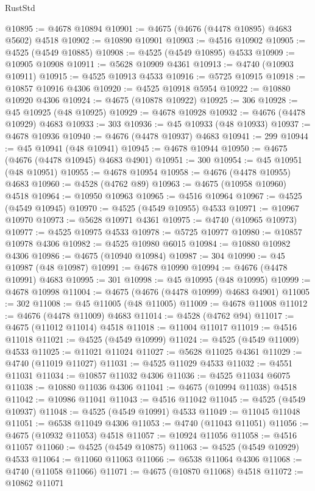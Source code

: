 \begin{lexlean}{RustStd}
\begin{coremodule}
{\begin{coremodule}
{{{{{{{{{{{{{{{{{{{{{{{{{{{{{{{{{{{{{{{{{{{{{{{{{{{{{{{{{{{{@10895 := @4678 @10894
@10901 := @4675 (@4676 (@4478 @10895) @4683 @5602) @4518
@10902 := @10890 @10901
@10903 := @4516 @10902
@10905 := @4525 (@4549 @10885)
@10908 := @4525 (@4549 @10895) @4533
@10909 := @10905 @10908
@10911 := @5628 @10909 @4361
@10913 := @4740 (@10903 @10911)
@10915 := @4525 @10913 @4533
@10916 := @5725 @10915
@10918 := @10857 @10916 @4306
@10920 := @4525 @10918 @5954
@10922 := @10880 @10920 @4306
@10924 := @4675 (@10878 @10922)
@10925 := 306
@10928 := @45 @10925 (@48 @10925)
@10929 := @4678 @10928
@10932 := @4676 (@4478 @10929) @4683
@10933 := 303
@10936 := @45 @10933 (@48 @10933)
@10937 := @4678 @10936
@10940 := @4676 (@4478 @10937) @4683
@10941 := 299
@10944 := @45 @10941 (@48 @10941)
@10945 := @4678 @10944
@10950 := @4675 (@4676 (@4478 @10945) @4683 @4901)
@10951 := 300
@10954 := @45 @10951 (@48 @10951)
@10955 := @4678 @10954
@10958 := @4676 (@4478 @10955) @4683
@10960 := @4528 (@4762 @89)
@10963 := @4675 (@10958 @10960) @4518
@10964 := @10950 @10963
@10965 := @4516 @10964
@10967 := @4525 (@4549 @10945)
@10970 := @4525 (@4549 @10955) @4533
@10971 := @10967 @10970
@10973 := @5628 @10971 @4361
@10975 := @4740 (@10965 @10973)
@10977 := @4525 @10975 @4533
@10978 := @5725 @10977
@10980 := @10857 @10978 @4306
@10982 := @4525 @10980 @6015
@10984 := @10880 @10982 @4306
@10986 := @4675 (@10940 @10984)
@10987 := 304
@10990 := @45 @10987 (@48 @10987)
@10991 := @4678 @10990
@10994 := @4676 (@4478 @10991) @4683
@10995 := 301
@10998 := @45 @10995 (@48 @10995)
@10999 := @4678 @10998
@11004 := @4675 (@4676 (@4478 @10999) @4683 @4901)
@11005 := 302
@11008 := @45 @11005 (@48 @11005)
@11009 := @4678 @11008
@11012 := @4676 (@4478 @11009) @4683
@11014 := @4528 (@4762 @94)
@11017 := @4675 (@11012 @11014) @4518
@11018 := @11004 @11017
@11019 := @4516 @11018
@11021 := @4525 (@4549 @10999)
@11024 := @4525 (@4549 @11009) @4533
@11025 := @11021 @11024
@11027 := @5628 @11025 @4361
@11029 := @4740 (@11019 @11027)
@11031 := @4525 @11029 @4533
@11032 := @4551 @11031
@11034 := @10857 @11032 @4306
@11036 := @4525 @11034 @6075
@11038 := @10880 @11036 @4306
@11041 := @4675 (@10994 @11038) @4518
@11042 := @10986 @11041
@11043 := @4516 @11042
@11045 := @4525 (@4549 @10937)
@11048 := @4525 (@4549 @10991) @4533
@11049 := @11045 @11048
@11051 := @6538 @11049 @4306
@11053 := @4740 (@11043 @11051)
@11056 := @4675 (@10932 @11053) @4518
@11057 := @10924 @11056
@11058 := @4516 @11057
@11060 := @4525 (@4549 @10875)
@11063 := @4525 (@4549 @10929) @4533
@11064 := @11060 @11063
@11066 := @6538 @11064 @4306
@11068 := @4740 (@11058 @11066)
@11071 := @4675 (@10870 @11068) @4518
@11072 := @10862 @11071
}}}}}}}}}}}}}}}}}}}}}}}}}}}}}}}}}}}}}}}}}}}}}}}}}}}}}}}}}}}}
\end{coremodule}}
\end{coremodule}
\end{lexlean}
